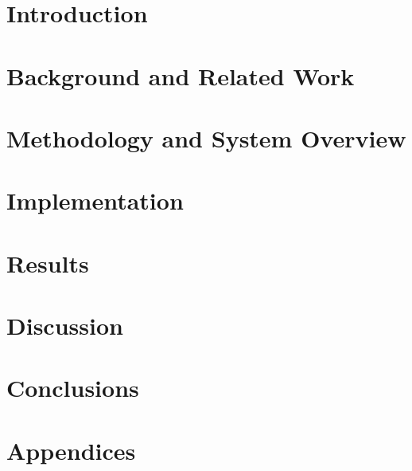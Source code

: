 \documentclass[a4paper, 12pt, openany]{book} %
\begin{document}

\chapter{Introduction}

\cleardoublepage


\chapter{Background and Related Work}

\cleardoublepage


\chapter{Methodology and System Overview}

\cleardoublepage


\chapter{Implementation}

\cleardoublepage


\chapter{Results}

\cleardoublepage


\chapter{Discussion}

\cleardoublepage


\chapter{Conclusions}

\cleardoublepage


\printbibliography[title={References}] 
\cleardoublepage


\chapter*{\LARGE \textbf{Appendices}}
\fancyhf{} %
\renewcommand{\headrulewidth}{0pt} %
\fancyfoot[C]{\thepage} %

\appendix

\end{document}
